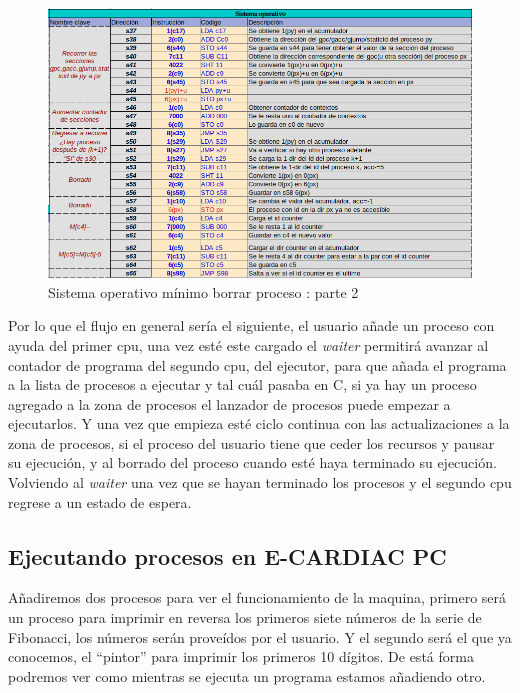 \documentclass[letterpaper,12pt,oneside]{book}
\begin{document}
			
			\begin{figure}[h]		
				\centering
				\includegraphics[scale=0.53]{media/Paralela/sop_erase2}
				\caption{Sistema operativo mínimo borrar proceso : parte 2}
				\label{fig:sop_erase2}
			\end{figure}

			
				Por lo que el flujo en general sería el siguiente, el usuario añade un proceso con ayuda del primer cpu, una vez esté este cargado
				el \textit{waiter} permitirá avanzar al contador de programa del segundo cpu, del ejecutor, para que añada el programa a la lista
				de procesos a ejecutar y tal cuál pasaba en C, si ya hay un proceso agregado a la zona de procesos el lanzador de procesos
				puede empezar a ejecutarlos. Y una vez que empieza esté ciclo continua con las actualizaciones a la zona de procesos,
				si el proceso del usuario tiene que ceder los recursos y pausar su ejecución, y al borrado del proceso cuando
				esté haya terminado su ejecución. Volviendo al \textit{waiter} una vez que se hayan terminado los procesos
				y el segundo cpu regrese a un estado de espera.

			\clearpage	
			
		\subsection{Ejecutando procesos en E-CARDIAC PC}		
			
			Añadiremos dos procesos para ver el funcionamiento de la maquina, primero será un proceso para imprimir en reversa los primeros
			siete números de la serie de Fibonacci, los números serán proveídos por el usuario. Y el segundo será el que ya conocemos, el
			``pintor'' para imprimir los primeros 10 dígitos. De está forma podremos ver como mientras se ejecuta un programa estamos añadiendo otro.
		
\end{document}
